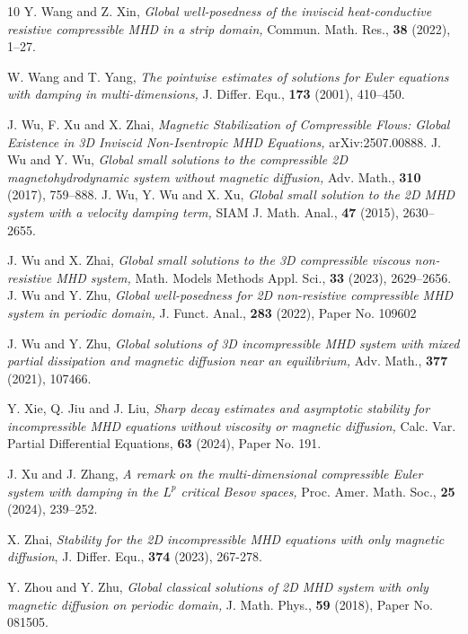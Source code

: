 \documentclass[12pt, reqno]{amsart}
\numberwithin{equation}{section}
\numberwithin{equation}{section}
\numberwithin{equation}{section}
\numberwithin{equation}{section}
\theoremstyle{remark}
\begin{document}
\begin{thebibliography}{10}
 Y. Wang and  Z. Xin,  {\it Global well-posedness of the inviscid heat-conductive resistive compressible MHD in a strip domain,} Commun. Math. Res., \textbf{38} (2022),  1--27.

W. Wang and  T. Yang, {\it The pointwise estimates of solutions for Euler equations with damping in
multi-dimensions,}  J. Differ. Equ.,  \textbf{173} (2001), 410--450.

J. Wu, F. Xu and X. Zhai, {\it Magnetic Stabilization of Compressible Flows: Global Existence in 3D Inviscid Non-Isentropic MHD Equations,} arXiv:2507.00888.
 J. Wu and  Y. Wu, {\it Global small solutions to the compressible 2D magnetohydrodynamic system without magnetic diffusion,} Adv. Math., \textbf{310} (2017), 759--888.
J. Wu, Y. Wu and X. Xu, {\it Global small solution to the 2D MHD system with a velocity damping term,}
SIAM J. Math. Anal., \textbf{47} (2015), 2630--2655.

 J. Wu and X. Zhai, {\it Global small solutions to the 3D compressible viscous non-resistive MHD system,} Math. Models Methods Appl. Sci., {\bf 33} (2023),  2629--2656.
 J. Wu and  Y. Zhu, {\it Global well-posedness for 2D non-resistive compressible MHD system in periodic domain,} J. Funct. Anal., \textbf{283} (2022), Paper No. 109602


    J. Wu and Y. Zhu,  {\it Global solutions of 3D incompressible MHD system with mixed partial dissipation and magnetic diffusion near an equilibrium,} Adv. Math.,  \textbf{377} (2021), 107466.


 Y. Xie, Q. Jiu and  J. Liu,  {\it Sharp decay estimates and asymptotic stability for incompressible MHD equations without viscosity or magnetic diffusion,} Calc. Var. Partial Differential Equations, {\bf 63} (2024),  Paper No. 191.


 J. Xu and  J. Zhang, {\it A remark on the multi-dimensional compressible Euler system with damping in
the $L^{p}$ critical Besov spaces,} Proc. Amer. Math. Soc., \textbf{25} (2024), 239--252.

X. Zhai, {\it Stability for the 2D incompressible MHD equations with only magnetic diffusion},  J. Differ. Equ.,  {\bf374} (2023), 267-278.

Y. Zhou and  Y. Zhu,  {\it Global classical solutions of 2D MHD system with only magnetic diffusion on periodic domain,} J. Math. Phys., {\bf 59} (2018), Paper No. 081505.


\end{thebibliography}
\end{document}
